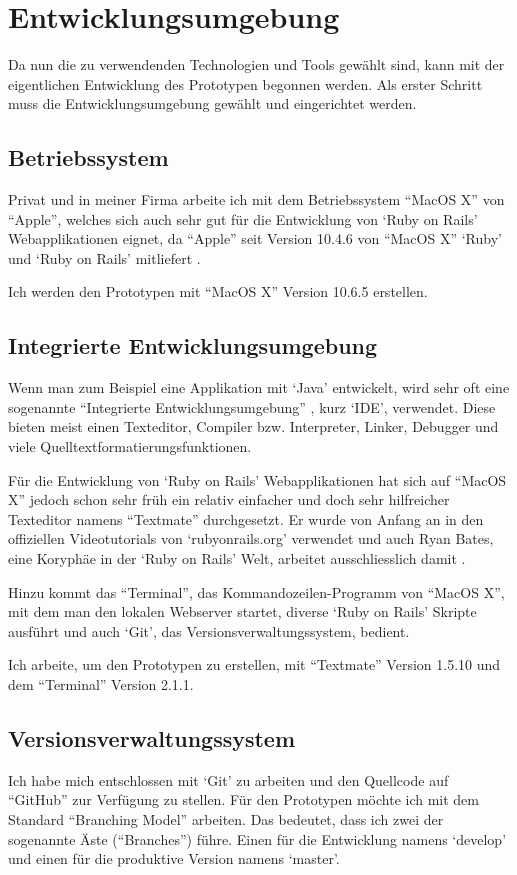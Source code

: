 \section{Entwicklungsumgebung}
Da nun die zu verwendenden Technologien und Tools gewählt sind, kann mit der
eigentlichen Entwicklung des Prototypen begonnen werden. Als erster Schritt
muss die Entwicklungsumgebung gewählt und eingerichtet werden.

\subsection{Betriebssystem}
Privat und in meiner Firma arbeite ich mit dem Betriebssystem ``MacOS X'' von ``Apple'',
welches sich auch sehr gut für die Entwicklung von `Ruby on Rails' Webapplikationen
eignet, da ``Apple'' seit Version 10.4.6 von ``MacOS X'' `Ruby' und `Ruby on Rails' 
mitliefert \cite{macosx}.

Ich werden den Prototypen mit ``MacOS X'' Version 10.6.5 erstellen.

\subsection{Integrierte Entwicklungsumgebung}
Wenn man zum Beispiel eine Applikation mit `Java' entwickelt, wird sehr oft eine
sogenannte ``Integrierte Entwicklungsumgebung'' \cite{ide}, kurz `IDE', verwendet.
Diese bieten meist einen Texteditor, Compiler bzw. Interpreter, Linker, Debugger
und viele Quelltextformatierungsfunktionen.

Für die Entwicklung von `Ruby on Rails' Webapplikationen hat sich auf ``MacOS X''
jedoch schon sehr früh ein relativ einfacher und doch sehr hilfreicher Texteditor
namens ``Textmate'' durchgesetzt. Er wurde von Anfang an in den offiziellen Videotutorials 
von `rubyonrails.org' verwendet und auch Ryan Bates, eine Koryphäe in der
`Ruby on Rails' Welt, arbeitet ausschliesslich damit \cite{ryanbates}. 

Hinzu kommt das ``Terminal'', das Kommandozeilen-Programm von ``MacOS X'', mit
dem man den lokalen Webserver startet, diverse `Ruby on Rails' Skripte ausführt
und auch `Git', das Versionsverwaltungssystem, bedient.

Ich arbeite, um den Prototypen zu erstellen, mit ``Textmate'' Version 1.5.10
und dem ``Terminal'' Version 2.1.1.

\subsection{Versionsverwaltungssystem}
Ich habe mich entschlossen mit `Git' zu arbeiten und den Quellcode auf ``GitHub''
zur Verfügung zu stellen. Für den Prototypen möchte ich mit dem Standard
``Branching Model'' \cite{branching_model} arbeiten. Das bedeutet, dass ich
zwei der sogenannte Äste (``Branches'') führe. Einen für die Entwicklung namens 
`develop' und einen für die produktive Version namens `master'.

